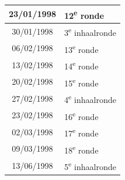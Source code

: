 \documentclass[a4paper]{scrreprt}
\begin{document}
\begin{landscape}
\begin{center}
\begin{tabular}{ c l }
    \hline
\rowcolor{headingkleur!25}
    23/01/1998 & 12\textsuperscript{e} ronde \\
    \hline
\rowcolor{headingkleur!10}
    30/01/1998 & 3\textsuperscript{e} inhaalronde \\
    \hline
\rowcolor{headingkleur!25}
    06/02/1998 & 13\textsuperscript{e} ronde \\
    \hline
\rowcolor{headingkleur!25}
    13/02/1998 & 14\textsuperscript{e} ronde \\
    \hline
\rowcolor{headingkleur!25}
    20/02/1998 & 15\textsuperscript{e} ronde \\
    \hline
\rowcolor{headingkleur!10}
    27/02/1998 & 4\textsuperscript{e} inhaalronde \\
    \hline
\rowcolor{headingkleur!25}
    23/02/1998 & 16\textsuperscript{e} ronde \\
    \hline
\rowcolor{headingkleur!25}
    02/03/1998 & 17\textsuperscript{e} ronde \\
    \hline
\rowcolor{headingkleur!25}
    09/03/1998 & 18\textsuperscript{e} ronde \\
    \hline
\rowcolor{headingkleur!10}
    13/06/1998 & 5\textsuperscript{e} inhaalronde \\
    \hline
   \end{tabular}
  \end{center}
 \end{landscape}
\end{document}
